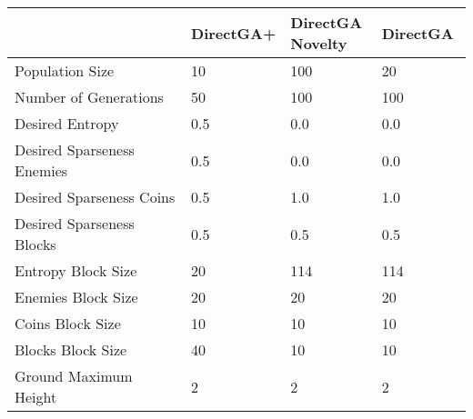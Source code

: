 \begin{tabular}{p{0.4\linewidth}p{0.2\linewidth}p{0.2\linewidth}p{0.2\linewidth}}
\toprule
{} & DirectGA+ & DirectGA Novelty & DirectGA \\
\midrule
Population Size            &        10 &              100 &       20 \\
Number of Generations      &        50 &              100 &      100 \\
Desired Entropy            &       0.5 &              0.0 &      0.0 \\
Desired Sparseness Enemies &       0.5 &              0.0 &      0.0 \\
Desired Sparseness Coins   &       0.5 &              1.0 &      1.0 \\
Desired Sparseness Blocks  &       0.5 &              0.5 &      0.5 \\
Entropy Block Size         &        20 &              114 &      114 \\
Enemies Block Size         &        20 &               20 &       20 \\
Coins Block Size           &        10 &               10 &       10 \\
Blocks Block Size          &        40 &               10 &       10 \\
Ground Maximum Height      &         2 &                2 &        2 \\
\bottomrule
\end{tabular}
